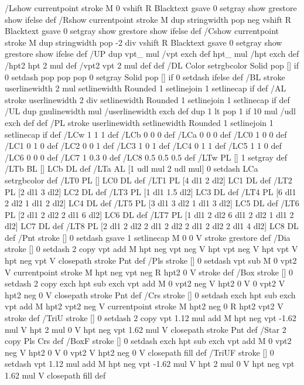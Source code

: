 /Lshow {currentpoint stroke M 0 vshift R 
	Blacktext {gsave 0 setgray show grestore} {show} ifelse} def
/Rshow {currentpoint stroke M dup stringwidth pop neg vshift R
	Blacktext {gsave 0 setgray show grestore} {show} ifelse} def
/Cshow {currentpoint stroke M dup stringwidth pop -2 div vshift R 
	Blacktext {gsave 0 setgray show grestore} {show} ifelse} def
/UP {dup vpt_ mul /vpt exch def hpt_ mul /hpt exch def
  /hpt2 hpt 2 mul def /vpt2 vpt 2 mul def} def
/DL {Color {setrgbcolor Solid {pop []} if 0 setdash}
 {pop pop pop 0 setgray Solid {pop []} if 0 setdash} ifelse} def
/BL {stroke userlinewidth 2 mul setlinewidth
	Rounded {1 setlinejoin 1 setlinecap} if} def
/AL {stroke userlinewidth 2 div setlinewidth
	Rounded {1 setlinejoin 1 setlinecap} if} def
/UL {dup gnulinewidth mul /userlinewidth exch def
	dup 1 lt {pop 1} if 10 mul /udl exch def} def
/PL {stroke userlinewidth setlinewidth
	Rounded {1 setlinejoin 1 setlinecap} if} def
/LCw {1 1 1} def
/LCb {0 0 0} def
/LCa {0 0 0} def
/LC0 {1 0 0} def
/LC1 {0 1 0} def
/LC2 {0 0 1} def
/LC3 {1 0 1} def
/LC4 {0 1 1} def
/LC5 {1 1 0} def
/LC6 {0 0 0} def
/LC7 {1 0.3 0} def
/LC8 {0.5 0.5 0.5} def
/LTw {PL [] 1 setgray} def
/LTb {BL [] LCb DL} def
/LTa {AL [1 udl mul 2 udl mul] 0 setdash LCa setrgbcolor} def
/LT0 {PL [] LC0 DL} def
/LT1 {PL [4 dl1 2 dl2] LC1 DL} def
/LT2 {PL [2 dl1 3 dl2] LC2 DL} def
/LT3 {PL [1 dl1 1.5 dl2] LC3 DL} def
/LT4 {PL [6 dl1 2 dl2 1 dl1 2 dl2] LC4 DL} def
/LT5 {PL [3 dl1 3 dl2 1 dl1 3 dl2] LC5 DL} def
/LT6 {PL [2 dl1 2 dl2 2 dl1 6 dl2] LC6 DL} def
/LT7 {PL [1 dl1 2 dl2 6 dl1 2 dl2 1 dl1 2 dl2] LC7 DL} def
/LT8 {PL [2 dl1 2 dl2 2 dl1 2 dl2 2 dl1 2 dl2 2 dl1 4 dl2] LC8 DL} def
/Pnt {stroke [] 0 setdash gsave 1 setlinecap M 0 0 V stroke grestore} def
/Dia {stroke [] 0 setdash 2 copy vpt add M
  hpt neg vpt neg V hpt vpt neg V
  hpt vpt V hpt neg vpt V closepath stroke
  Pnt} def
/Pls {stroke [] 0 setdash vpt sub M 0 vpt2 V
  currentpoint stroke M
  hpt neg vpt neg R hpt2 0 V stroke
 } def
/Box {stroke [] 0 setdash 2 copy exch hpt sub exch vpt add M
  0 vpt2 neg V hpt2 0 V 0 vpt2 V
  hpt2 neg 0 V closepath stroke
  Pnt} def
/Crs {stroke [] 0 setdash exch hpt sub exch vpt add M
  hpt2 vpt2 neg V currentpoint stroke M
  hpt2 neg 0 R hpt2 vpt2 V stroke} def
/TriU {stroke [] 0 setdash 2 copy vpt 1.12 mul add M
  hpt neg vpt -1.62 mul V
  hpt 2 mul 0 V
  hpt neg vpt 1.62 mul V closepath stroke
  Pnt} def
/Star {2 copy Pls Crs} def
/BoxF {stroke [] 0 setdash exch hpt sub exch vpt add M
  0 vpt2 neg V hpt2 0 V 0 vpt2 V
  hpt2 neg 0 V closepath fill} def
/TriUF {stroke [] 0 setdash vpt 1.12 mul add M
  hpt neg vpt -1.62 mul V
  hpt 2 mul 0 V
  hpt neg vpt 1.62 mul V closepath fill} def
